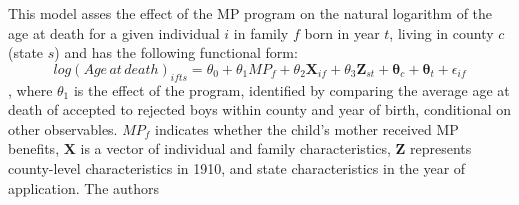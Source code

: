 This model asses the effect of the MP program on the natural logarithm of the age at death for a given individual $i$ in family $f$ born in year $t$, living in county $c$ (state $s$) and has the following functional form:
$$
log(Age\,at\,death)_{ifts} = \theta_0 + \theta_1MP_f + \theta_2\mathbf{X}_{if} + \theta_3\mathbf{Z}_{st} + \mathbf{\theta}_c + \mathbf{\theta}_t + \epsilon_{if}
$$
, where $\theta_1$ is the effect of the program, identified by comparing the average age at death of accepted to rejected boys within county and year of birth, conditional on other observables. $MP_f$ indicates whether the child's mother received MP benefits, $\mathbf{X}$ is a vector of individual and family characteristics, $\mathbf{Z}$ represents county-level characteristics in 1910, and state characteristics in the year of application. The authors 

